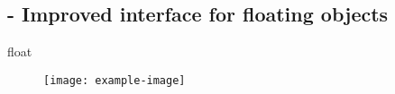 
\subsection{ - Improved interface for floating objects}

\begin{demo}{}{float}
	\begin{figure}[H]
		\centering
		\texttt{[image: example-image]}
		\caption{}
	\end{figure}
\end{demo}
